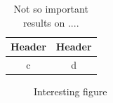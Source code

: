 \documentclass[10pt,a4paper]{article}
\begin{document}
\phantom{ } %

\begin{table}[h!]
\centering
\caption{Not so important results on ....}

\begin{tabular}{cc}
\hline
Header & Header\\
\hline
c & d\\
\hline
\end{tabular}
\end{table}

\phantom{ } %

\begin{figure}[h!]
\caption{Interesting figure}
\end{figure}
\end{document}
